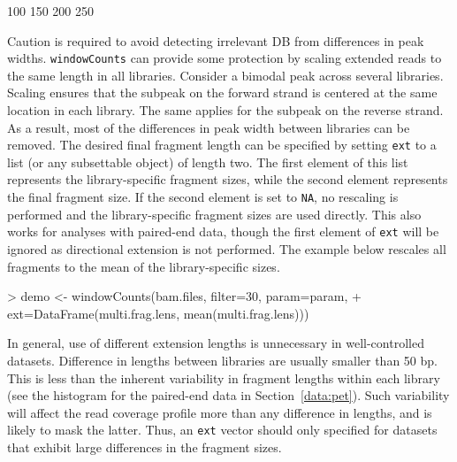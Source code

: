 \documentclass[12pt]{report}
\renewenvironment{Schunk}{\vspace{0pt}}{\vspace{0pt}}
\newcommand{\code}[1]{{\small\texttt{#1}}}
\begin{document}
\begin{Schunk}
\begin{Soutput}
[1] 100 150 200 250
\end{Soutput}
\end{Schunk}

Caution is required to avoid detecting irrelevant DB from differences in peak widths.
\code{windowCounts} can provide some protection by scaling extended reads to the same length in all libraries.
Consider a bimodal peak across several libraries.
Scaling ensures that the subpeak on the forward strand is centered at the same location in each library.
The same applies for the subpeak on the reverse strand.
As a result, most of the differences in peak width between libraries can be removed.
The desired final fragment length can be specified by setting \code{ext} to a list (or any subsettable object) of length two.
The first element of this list represents the library-specific fragment sizes, while the second element represents the final fragment size.
If the second element is set to \code{NA}, no rescaling is performed and the library-specific fragment sizes are used directly.
This also works for analyses with paired-end data, though the first element of \code{ext} will be ignored as directional extension is not performed.
The example below rescales all fragments to the mean of the library-specific sizes.

\begin{Schunk}
\begin{Sinput}
> demo <- windowCounts(bam.files, filter=30, param=param,
+     ext=DataFrame(multi.frag.lens, mean(multi.frag.lens))) 
\end{Sinput}
\end{Schunk}

In general, use of different extension lengths is unnecessary in well-controlled datasets.
Difference in lengths between libraries are usually smaller than 50 bp.
This is less than the inherent variability in fragment lengths within each library (see the histogram for the paired-end data in Section~\ref{data:pet}).
Such variability will affect the read coverage profile more than any difference in lengths, and is likely to mask the latter.
Thus, an \code{ext} vector should only specified for datasets that exhibit large differences in the fragment sizes.
\end{document}

